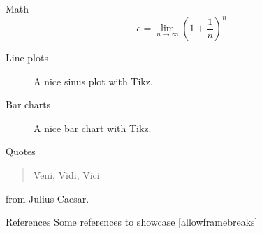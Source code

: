 	\begin{frame}{Math}
		\begin{equation}
			e = \lim_{n\to \infty} \left(1 + \frac{1}{n}\right)^n
		\end{equation}
	\end{frame}
	
	\begin{frame}{Line plots}
		\begin{figure}
			\centering
			\caption{A nice sinus plot with Tikz.}
		\end{figure}
	\end{frame}
	
	\begin{frame}{Bar charts}
		\begin{figure}
			\centering
			\caption{A nice bar chart with Tikz.}
		\end{figure}
	\end{frame}
	
	\begin{frame}{Quotes}
		\begin{quote}
			Veni, Vidi, Vici
		\end{quote}
		from Julius Caesar.
	\end{frame}
		
	\begin{frame}{References}
		Some references to showcase [allowframebreaks] \cite{Knuth92,ConcreteMath,Simpson,Er01,greenwade93}
	\end{frame}
